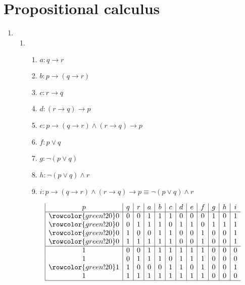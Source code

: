 \documentclass{article}
\begin{document}
\section{Propositional calculus}

\begin{enumerate}[label=(\alph*)]

    \item 
    \begin{enumerate}[label=\roman*.]
        \item
        \begin{enumerate}[label={}]         
             \item $a: q\rightarrow{}r$
             \item $b: p\rightarrow{}(q\rightarrow{}r)$
             \item $c: r\rightarrow{}q$
             \item $d: (r\rightarrow{}q)\rightarrow{}p$
             \item $e: p\rightarrow{}(q\rightarrow{}r)\wedge{}(r\rightarrow{}q)\rightarrow{}p$
             \item $f: p\vee{}q$
             \item $g: \neg{}(p\vee{}q)$
             \item $h: \neg{}(p\vee{}q)\wedge{}r$
             \item $i: p\rightarrow{}(q\rightarrow{}r)\wedge{}(r\rightarrow{}q)\rightarrow{}p\equiv \neg{}(p\vee{}q)\wedge{}r$
        \end{enumerate}
        \begin{displaymath}
            \begin{array}{|c|c|c|c|c|c|c|c|c|c|c|c}
               p & q & r & a & b & c & d & e & f & g & h & i \\
            \hline
            \rowcolor{green!20}
            0 & 0 & 0 & 1 & 1 & 1 & 0 & 0 & 0 & 1 & 0 & 1 \\
            \rowcolor{green!20}
            0 & 0 & 1 & 1 & 1 & 0 & 1 & 1 & 0 & 1 & 1 & 1 \\
            \rowcolor{green!20}
            0 & 1 & 0 & 0 & 1 & 1 & 0 & 0 & 1 & 0 & 0 & 1 \\
            \rowcolor{green!20}
            0 & 1 & 1 & 1 & 1 & 1 & 0 & 0 & 1 & 0 & 0 & 1 \\
            \hline
            1 & 0 & 0 & 1 & 1 & 1 & 1 & 1 & 1 & 0 & 0 & 0 \\
            1 & 0 & 1 & 1 & 1 & 0 & 1 & 1 & 1 & 0 & 0 & 0 \\
            \rowcolor{green!20}
            1 & 1 & 0 & 0 & 0 & 1 & 1 & 0 & 1 & 0 & 0 & 1 \\
            1 & 1 & 1 & 1 & 1 & 1 & 1 & 1 & 1 & 0 & 0 & 0 \\
            \hline
            \end{array}
        \end{displaymath}
        

\end{enumerate}
\end{enumerate}
\end{document}

